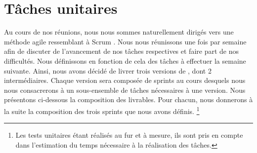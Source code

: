 \section{Tâches unitaires}
	\label{sec:taches_unitaires}

	Au cours de nos réunions, nous nous sommes naturellement dirigés vers une méthode agile ressemblant à \og Scrum \fg. Nous nous réunissons une fois par semaine afin de discuter de l'avancement de nos tâches respectives et faire part de nos difficultés. Nous définissons en fonction de cela des tâches à effectuer la semaine suivante. Ainsi, nous avons décidé de livrer trois versions de \glasir{}, dont 2 intermédiaires.
	Chaque version sera composée de sprints au cours desquels nous nous consacrerons à un sous-ensemble de tâches nécessaires à une version. %
	Nous présentons ci-dessous la composition des livrables. Pour chacun, nous donnerons à la suite la composition des trois sprints que nous avons définis.
	\footnote{Les tests unitaires étant réalisés au fur et à mesure, ils sont pris en compte dans l'estimation du temps nécessaire à la réalisation des tâches.}

